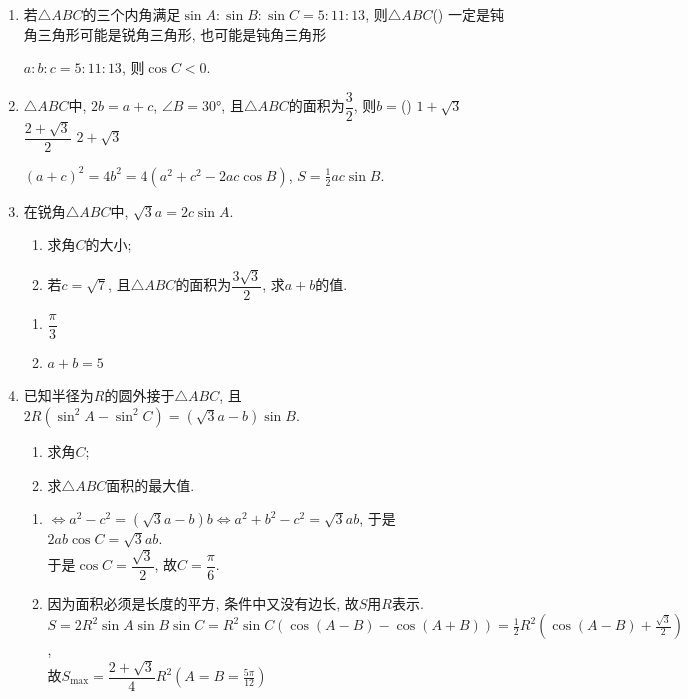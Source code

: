 \begin{enumerate}
\item 若$\triangle{ABC}$的三个内角满足$\sin{A}:\sin{B}:\sin{C}=5:11:13$, 则$\triangle{ABC}$\dotfill()
{一定是钝角三角形}{可能是锐角三角形, 也可能是钝角三角形}
\begin{jieda}
$a:b:c=5:11:13$, 则$\cos{C}<0$. 
\end{jieda}


\item $\triangle{ABC}$中, $2b=a+c$, $\angle{B}=\ang{30}$, 且$\triangle{ABC}$的面积为$\dfrac{3}{2}$, 则$b=$\dotfill() 
{$1+\sqrt{3}$}
{$\dfrac{2+\sqrt{3}}{2}$}
{$2+\sqrt{3}$}
\begin{jieda}
$(a+c)^2=4b^2=4(a^2+c^2-2ac\cos{B})$, $S=\frac{1}{2}ac\sin{B}$. 
\end{jieda}

\item 在锐角$\triangle{ABC}$中, $\sqrt{3}a=2c\sin{A}$. 
\begin{enumerate}
\item 求角$C$的大小;
\item 若$c=\sqrt{7}$, 且$\triangle{ABC}$的面积为$\dfrac{3\sqrt{3}}{2}$, 求$a+b$的值. 
\end{enumerate}
\begin{jieda}
\begin{enumerate}
\item $\dfrac{\pi}{3}$

\item $a+b=5$
\end{enumerate}
\end{jieda}


\item 已知半径为$R$的圆外接于$\triangle{ABC}$, 且$2R(\sin^2A-\sin^2C)=(\sqrt{3}a-b)\sin{B}$. 
\begin{enumerate}
\item 求角$C$; 
\item 求$\triangle{ABC}$面积的最大值. 
\end{enumerate}
\begin{jieda}
\begin{enumerate}
\item $\iff a^2-c^2=(\sqrt{3}a-b)b\iff a^2+b^2-c^2=\sqrt{3}ab$, 于是$2ab\cos{C}=\sqrt{3}ab$. \\
于是$\cos{C}=\dfrac{\sqrt{3}}{2}$, 故$C=\dfrac{\pi}{6}$. 

\item 因为面积必须是长度的平方, 条件中又没有边长, 故$S$用$R$表示. \\
$S=2R^2\sin{A}\sin{B}\sin{C}=R^2\sin{C}(\cos(A-B)-\cos(A+B))=\frac{1}{2}R^2(\cos(A-B)+\frac{\sqrt{3}}{2})$, \\
故$S_{\max}=\dfrac{2+\sqrt{3}}{4}R^2(A=B=\frac{5\pi}{12})$
\end{enumerate}
\end{jieda}


\end{enumerate}

